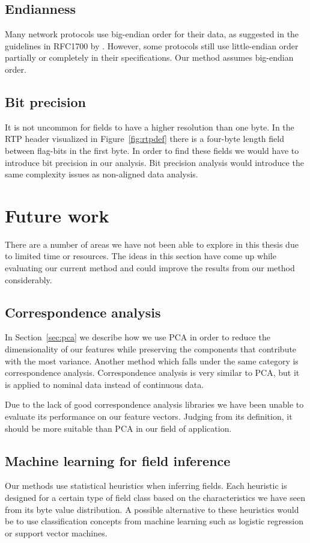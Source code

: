 \documentclass[a4paper]{report}
\begin{document}
\subsection{Endianness}
Many network protocols use big-endian order for their data, as suggested
in the guidelines in RFC1700 by \citet{reynolds94}. However, some protocols
still use little-endian order partially or completely in their specifications.
Our method assumes big-endian order.

\subsection{Bit precision}
It is not uncommon for fields to have a higher resolution than one byte. In
the RTP header visualized in Figure~\ref{fig:rtpdef} there is a four-byte
length field between flag-bits in the first byte. In order to find these
fields we would have to introduce bit precision in our analysis. Bit
precision analysis would introduce the same complexity issues as non-aligned
data analysis.


\section{Future work}
There are a number of areas we have not been able to explore in this thesis
due to limited time or resources. The ideas in this section have come up
while evaluating our current method and could improve the results from our
method considerably.

\subsection{Correspondence analysis}
In Section~\ref{sec:pca} we describe how we use PCA in order to reduce the
dimensionality of our features while preserving the components that contribute
with the most variance. Another method which falls under the same category is
correspondence analysis. Correspondence analysis is very similar to PCA, but
it is applied to nominal data instead of continuous data.

Due to the lack of good correspondence analysis libraries we have been unable
to evaluate its performance on our feature vectors. Judging from its
definition, it should be more suitable than PCA in our field of application.

\subsection{Machine learning for field inference}
Our methods use statistical heuristics when inferring fields. Each heuristic
is designed for a certain type of field class based on the characteristics we
have seen from its byte value distribution. A possible alternative to these
heuristics would be to use classification concepts from machine learning such
as logistic regression or support vector machines.
\end{document}
